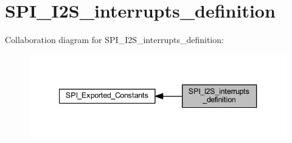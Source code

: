 \hypertarget{group___s_p_i___i2_s__interrupts__definition}{}\section{S\+P\+I\+\_\+\+I2\+S\+\_\+interrupts\+\_\+definition}
\label{group___s_p_i___i2_s__interrupts__definition}
Collaboration diagram for S\+P\+I\+\_\+\+I2\+S\+\_\+interrupts\+\_\+definition\+:
\nopagebreak
\begin{figure}[H]
\begin{center}
\leavevmode
\includegraphics[width=340pt]{group___s_p_i___i2_s__interrupts__definition}
\end{center}
\end{figure}

